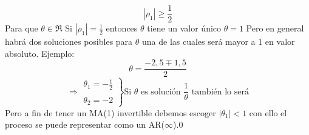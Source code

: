 \documentclass[12pt,letterpaper]{article}
\begin{document}
\begin{enumerate}
\begin{equation*}
        |\rho_1|\ge \frac{1}{2}
    \end{equation*}
    Para que $\theta \in \Re  $
    \newline
    \newline
    Si $|\rho_1| = \frac{1}{2}$ entonces $\theta$ tiene un valor único $\theta = 1$
    \newline
    Pero en general habrá dos soluciones posibles para $\theta$ una de las cuales será mayor a 1 en valor absoluto.
    \newline
    Ejemplo:
    \begin{equation*}
        \theta = \frac{-2,5\mp 1,5}{2}
    \end{equation*}
    \begin{equation*}
        \Rightarrow
        \left .
        \begin{array}{rcl}
            \theta_1 = -\frac{1}{2}\\ \\
            \theta_2 = -2
        \end{array}
        \right \} \text{Si $\theta$ es solución $\frac{1}{\theta}$ también lo será}
    \end{equation*}
    Pero a fin de tener un MA(1) invertible debemos escoger $|\theta_1|<1$ con ello el proceso se puede representar como un AR($\infty$).0
\end{enumerate}
\end{document}
